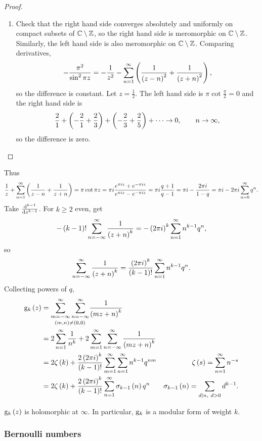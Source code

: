 \begin{proof}
\begin{enumerate}
\item Check that the right hand side converges absolutely and uniformly on compact subsets of $ \mathbb{C} \setminus \mathbb{Z} $, so the right hand side is meromorphic on $ \mathbb{C} \setminus \mathbb{Z} $. Similarly, the left hand side is also meromorphic on $ \mathbb{C} \setminus \mathbb{Z} $. Comparing derivatives,
$$ -\dfrac{\pi^2}{\sin^2 \pi z} = -\dfrac{1}{z^2} - \sum_{n = 1}^\infty \br{\dfrac{1}{\br{z - n}^2} + \dfrac{1}{\br{z + n}^2}}, $$
so the difference is constant. Let $ z = \tfrac{1}{2} $. The left hand side is $ \pi\cot \tfrac{\pi}{2} = 0 $ and the right hand side is
$$ \dfrac{2}{1} + \br{-\dfrac{2}{1} + \dfrac{2}{3}} + \br{-\dfrac{2}{3} + \dfrac{2}{5}} + \dots \to 0, \qquad n \to \infty, $$
so the difference is zero.
\end{enumerate}
\end{proof}

Thus
$$ \dfrac{1}{z} + \sum_{n = 1}^\infty \br{\dfrac{1}{z - n} + \dfrac{1}{z + n}} = \pi\cot \pi z = \pi i\dfrac{e^{\pi iz} + e^{-\pi iz}}{e^{\pi iz} - e^{-\pi iz}} = \pi i\dfrac{q + 1}{q - 1} = \pi i - \dfrac{2\pi i}{1 - q} = \pi i - 2\pi i\sum_{n = 0}^\infty q^n. $$
Take $ \tod[k - 1]{}{z} $. For $ k \ge 2 $ even, get
$$ -\br{k - 1}!\sum_{n = -\infty}^\infty \dfrac{1}{\br{z + n}^k} = -\br{2\pi i}^k\sum_{n = 1}^\infty n^{k - 1}q^n, $$
so
$$ \sum_{n = -\infty}^\infty \dfrac{1}{\br{z + n}^k} = \dfrac{\br{2\pi i}^k}{\br{k - 1}!}\sum_{n = 1}^\infty n^{k - 1}q^n. $$
Collecting powers of $ q $,
\begin{align*}
\g_k\br{z}
& = \underset{\br{m, n} \ne \br{0, 0}}{\sum_{m = -\infty}^\infty \sum_{n = -\infty}^\infty} \dfrac{1}{\br{mz + n}^k} \\
& = 2\sum_{n = 1}^\infty \dfrac{1}{n^k} + 2\sum_{m = 1}^\infty \sum_{n = -\infty}^\infty \dfrac{1}{\br{mz + n}^k} \\
& = 2\zeta\br{k} + \dfrac{2\br{2\pi i}^k}{\br{k - 1}!}\sum_{m = 1}^\infty \sum_{n = 1}^\infty n^{k - 1}q^{nm} & \zeta\br{s} = \sum_{n = 1}^\infty n^{-s} \\
& = 2\zeta\br{k} + \dfrac{2\br{2\pi i}^k}{\br{k - 1}!}\sum_{n = 1}^\infty \sigma_{k - 1}\br{n}q^n & \sigma_{k - 1}\br{n} = \sum_{d \mid n, \ d > 0} d^{k - 1}.
\end{align*}

\begin{corollary}
$ \g_k\br{z} $ is holomorphic at $ \infty $. In particular, $ \mathrm{g}_k $ is a modular form of weight $ k $.
\end{corollary}

\subsubsection{Bernoulli numbers}

